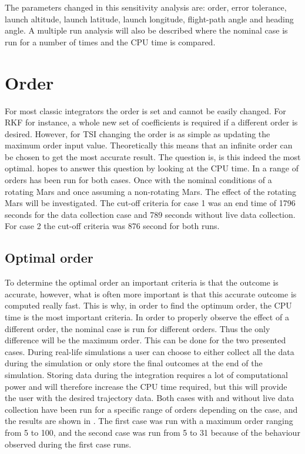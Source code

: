 The parameters changed in this sensitivity analysis are: order, error tolerance, launch altitude, launch latitude, launch longitude, flight-path angle and heading angle. A multiple run analysis will also be described where the nominal case is run for a number of times and the CPU time is compared. 


\section{Order}
\label{sec:order}
For most classic integrators the order is set and cannot be easily changed. For \ac{RKF} for instance, a whole new set of coefficients is required if a different order is desired. However, for \ac{TSI} changing the order is as simple as updating the maximum order input value. Theoretically this means that an infinite order can be chosen to get the most accurate result. The question is, is this indeed the most optimal.  hopes to answer this question by looking at the CPU time. In  a range of orders has been run for both cases. Once with the nominal conditions of a rotating Mars and once assuming a non-rotating Mars. The effect of the rotating Mars will be investigated. The cut-off criteria for case 1 was an end time of 1796 seconds for the data collection case and 789 seconds without live data collection. For case 2 the cut-off criteria was 876 second for both runs.

\subsection{Optimal order}
\label{subsec:optimalOrder}
To determine the optimal order an important criteria is that the outcome is accurate, however, what is often more important is that this accurate outcome is computed really fast. This is why, in order to find the optimum order, the CPU time is the most important criteria. In order to properly observe the effect of a different order, the nominal case is run for different orders. Thus the only difference will be the maximum order. This can be done for the two presented cases. During real-life simulations a user can choose to either collect all the data during the simulation or only store the final outcomes at the end of the simulation. Storing data during the integration requires a lot of computational power and will therefore increase the CPU time required, but this will provide the user with the desired trajectory data. Both cases with and without live data collection have been run for a specific range of orders depending on the case, and the results are shown in .
The first case was run with a maximum order ranging from 5 to 100, and the second case was run from 5 to 31 because of the behaviour observed during the first case runs. 



